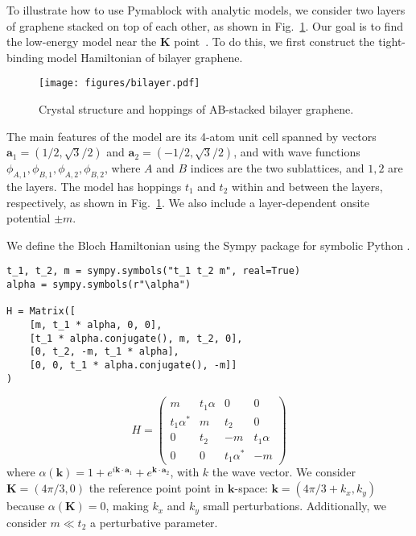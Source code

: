 To illustrate how to use Pymablock with analytic models, we consider two layers of graphene stacked on top of each other, as shown in Fig.~\ref{fig:bilayer}.
Our goal is to find the low-energy model near the $\mathbf{K}$ point~\cite{McCann_2013}.
To do this, we first construct the tight-binding model Hamiltonian of bilayer graphene.
%
\begin{figure}[!htbp]
\centering
\texttt{[image: figures/bilayer.pdf]}
\caption[]{Crystal structure and hoppings of AB-stacked bilayer graphene.}
\label{fig:bilayer}
\end{figure}
%
The main features of the model are its 4-atom unit cell spanned by vectors $\mathbf{a}_1 = (1/2, \sqrt{3}/2)$ and $\mathbf{a}_2=( -1/2, \sqrt{3}/2)$, and with wave functions $\phi_{A,1}, \phi_{B,1}, \phi_{A,2}, \phi_{B,2}$, where $A$ and $B$ indices are the two sublattices, and $1,2$ are the layers.
The model has hoppings $t_1$ and $t_2$ within and between the layers, respectively, as shown in Fig.~\ref{fig:bilayer}.
We also include a layer-dependent onsite potential $\pm m$.

We define the Bloch Hamiltonian using the Sympy package for symbolic Python \cite{Meurer_2017}.
%
\begin{verbatim}
t_1, t_2, m = sympy.symbols("t_1 t_2 m", real=True)
alpha = sympy.symbols(r"\alpha")

H = Matrix([
    [m, t_1 * alpha, 0, 0],
    [t_1 * alpha.conjugate(), m, t_2, 0],
    [0, t_2, -m, t_1 * alpha],
    [0, 0, t_1 * alpha.conjugate(), -m]]
)
\end{verbatim}
%
$$
H =
\begin{pmatrix}
m & t_1 \alpha & 0 & 0\\
t_1 \alpha^{*} & m & t_2 & 0\\
0 & t_2 & -m & t_1 \alpha\\
0 & 0 & t_1 \alpha^{*} & -m
\end{pmatrix}
$$
%
where $\alpha(\mathbf{k}) = 1 + e^{i \mathbf{k} \cdot \mathbf{a}_1} + e^{\mathbf{k} \cdot \mathbf{a}_2}$, with $k$ the wave vector.
We consider $\mathbf{K}=(4\pi/3, 0)$ the reference point point in $\mathbf{k}$-space: $\mathbf{k} = (4\pi/3 + k_x, k_y)$ because $\alpha(\mathbf{K}) = 0$, making $k_x$ and $k_y$ small perturbations.
Additionally, we consider $m \ll t_2$ a perturbative parameter.

